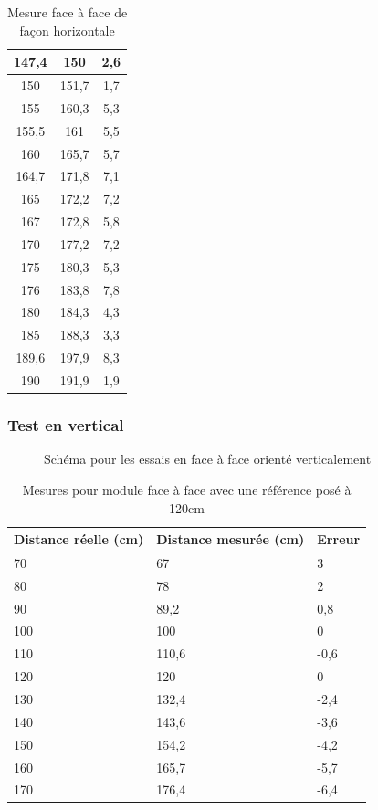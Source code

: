 \documentclass[11pt,a4paper]{article}
\begin{document}
\begin{table}[H]
\begin{minipage}[t]{0.48\textwidth}
\begin{tabular}{|c|c|c|}
        147,4 & 150   & 2,6  \\ \hline
        150   & 151,7 & 1,7  \\ \hline
        155   & 160,3 & 5,3  \\ \hline
        155,5 & 161   & 5,5  \\ \hline
        160   & 165,7 & 5,7  \\ \hline
        164,7 & 171,8 & 7,1  \\ \hline
        165   & 172,2 & 7,2  \\ \hline
        167   & 172,8 & 5,8  \\ \hline
        170   & 177,2 & 7,2  \\ \hline
        175   & 180,3 & 5,3  \\ \hline
        176   & 183,8 & 7,8  \\ \hline
        180   & 184,3 & 4,3  \\ \hline
        185   & 188,3 & 3,3  \\ \hline
        189,6 & 197,9 & 8,3  \\ \hline
        190   & 191,9 & 1,9  \\ \hline
        \end{tabular}
    \end{minipage}
    \caption{Mesure face à face de façon horizontale}
\end{table}

\subsubsection{Test en vertical}

\begin{figure}[H]
  \centering
  \FtFVertical
  \caption{Schéma pour les essais en face à face orienté verticalement}
\end{figure}

\begin{table}[H]
    \centering
    \begin{tabular}{|l|l|l|}
    \hline
        Distance réelle (cm) & Distance mesurée (cm) & Erreur  \\ \hline
        70 & 67 & 3 \\ \hline
        80 & 78 & 2 \\ \hline
        90 & 89,2 & 0,8 \\ \hline
        100 & 100 & 0 \\ \hline
        110 & 110,6 & -0,6 \\ \hline
        120 & 120 & 0 \\ \hline
        130 & 132,4 & -2,4 \\ \hline
        140 & 143,6 & -3,6 \\ \hline
        150 & 154,2 & -4,2 \\ \hline
        160 & 165,7 & -5,7 \\ \hline
        170 & 176,4 & -6,4 \\ \hline
    \end{tabular}
    \caption{Mesures pour module face à face avec une référence posé à 120cm}
\end{table}
\end{document}
